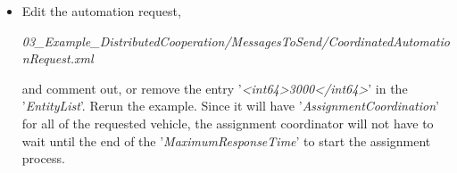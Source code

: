 \begin{itemize}
\item Edit the automation request,
\begin{docspec}
\textit{03\_Example\_DistributedCooperation/MessagesToSend/CoordinatedAutomationRequest.xml}
\end{docspec}
and comment out, or remove the entry '\textit{<int64>3000</int64>}' in the '\textit{EntityList}'. Rerun the example. Since it will have '\textit{AssignmentCoordination}' for all of the requested vehicle, the assignment coordinator will not have to wait until the end of the '\textit{MaximumResponseTime}' to start the assignment process.
\end{itemize} 
